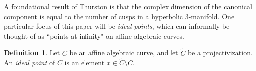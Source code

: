 \documentclass{article}
\theoremstyle{plain}
\theoremstyle{definition}
\newtheorem{definition}[theorem]{Definition}
\theoremstyle{plain}
\theoremstyle{plain}
\theoremstyle{plain}
\theoremstyle{remark}
\theoremstyle{remark}
\theoremstyle{plain}
\theoremstyle{plain}
\begin{document}
A foundational result of Thurston \cite{thurston} is that the complex dimension of the canonical component is equal to the number of cusps in a hyperbolic 3-manifold. One particular focus of this paper will be \emph{ideal points}, which can informally be thought of as ``points at infinity" on affine algebraic curves. 

\begin{definition}
Let $C$ be an affine algebraic curve, and let $\widetilde{C}$ be a projectivization. An \emph{ideal point} of $C$ is an element $x \in \widetilde{C} \setminus C$. 
\end{definition}
%
%
%
%
\end{document}
